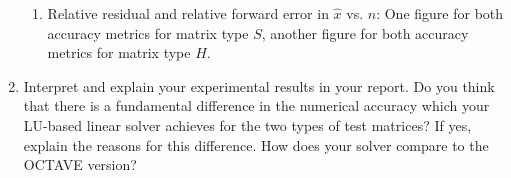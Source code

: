 \documentclass{scrartcl}
\begin{document}
\begin{enumerate}
            \begin{enumerate}
            \item Relative residual and relative forward error in $\hat{x}$ vs. $n$: One figure for both accuracy metrics for matrix type $S$, another figure for both accuracy metrics for matrix type $H$.
            \end{enumerate}
        \item Interpret and explain your experimental results in your report. Do you think that there is a fundamental difference in the numerical accuracy which your LU-based linear solver achieves for the two types of test matrices? If yes, explain the reasons for this difference. How does your solver compare to the OCTAVE version?
    \end{enumerate}
\end{document}
